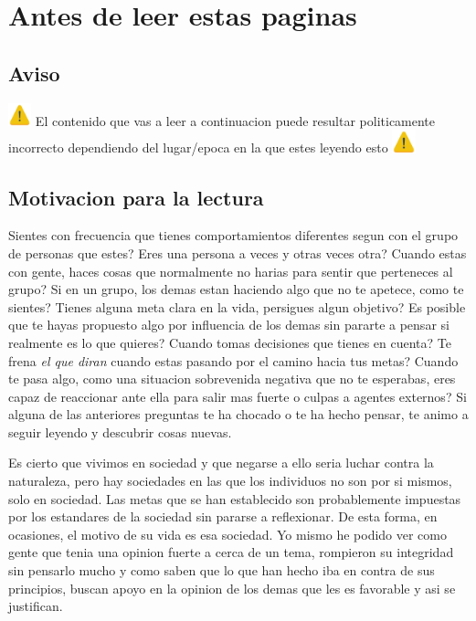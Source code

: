 \chapter{Antes de leer estas paginas}
\section{Aviso}
\begin{mdframed}[backgroundcolor=yellow]
	\includegraphics[width=0.05\textwidth]{figures/warning.png}
	El contenido que vas a leer a continuacion puede resultar politicamente incorrecto dependiendo del lugar/epoca en la que estes leyendo esto
	\includegraphics[width=0.05\textwidth]{figures/warning.png}
\end{mdframed}
\section{Motivacion para la lectura}
Sientes con frecuencia que tienes comportamientos diferentes segun con el grupo de personas que estes? Eres una persona a veces y otras veces otra? 
Cuando estas con gente, haces cosas que normalmente no harias para sentir que perteneces al grupo? 
Si en un grupo, los demas estan haciendo algo que no te apetece, como te sientes? 
Tienes alguna meta clara en la vida, persigues algun objetivo? Es posible que te hayas propuesto algo por influencia de los demas sin pararte a pensar si realmente es lo que quieres? 
Cuando tomas decisiones que tienes en cuenta? Te frena \textit{el que diran} cuando estas pasando por el camino hacia tus metas?
Cuando te pasa algo, como una situacion sobrevenida negativa que no te esperabas, eres capaz de reaccionar ante ella para salir mas fuerte o culpas a agentes externos?
Si alguna de las anteriores preguntas te ha chocado o te ha hecho pensar, te animo a seguir leyendo y descubrir cosas nuevas. 

Es cierto que vivimos en sociedad y que negarse a ello seria luchar contra la naturaleza, pero hay sociedades en las que los individuos no son por si mismos, solo en sociedad. Las metas que se han establecido son probablemente impuestas por los estandares de la sociedad sin pararse a reflexionar. De esta forma, en ocasiones, el motivo de su vida es esa sociedad.
Yo mismo he podido ver como gente que tenia una opinion fuerte a cerca de un tema, rompieron su integridad sin pensarlo mucho y como saben que lo que han hecho iba en contra de sus principios, buscan apoyo en la opinion de los demas que les es favorable y asi se justifican. 
